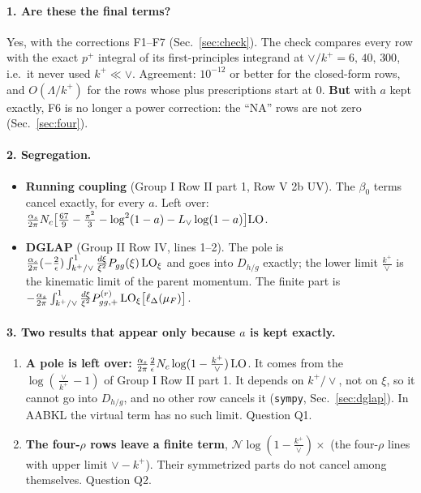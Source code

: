 \documentclass[10pt]{article}
\numberwithin{equation}{section}
\newcommand{\Lv}{L_{\vee}}
\newcommand{\NN}{\mathcal N}
\newcommand{\LOx}[1]{{\rm LO}_\xi\big[#1\big]}
\begin{document}
\paragraph{1. Are these the final terms?} Yes, with the corrections F1--F7 (Sec.~\ref{sec:check}). The check compares every row with the exact $p^+$ integral of its first-principles integrand at $\vee/k^+=6,\,40,\,300$, i.e.\ it never used $k^+\ll\vee$. Agreement: $10^{-12}$ or better for the closed-form rows, and $O(\Lambda/k^+)$ for the rows whose plus prescriptions start at 0. \textbf{But} with $a$ kept exactly, F6 is no longer a power correction: the ``NA'' rows are not zero (Sec.~\ref{sec:four}).

\paragraph{2. Segregation.}
\begin{itemize}
\item \textbf{Running coupling} (Group I Row II part 1, Row V 2b UV). The $\beta_0$ terms cancel exactly, for every $a$. Left over: $\frac{\alpha_s}{2\pi}N_c\big[\frac{67}{9}-\frac{\pi^2}{3}-\log^2(1-a)-\Lv\log(1-a)\big]{\rm LO}$.
\item \textbf{DGLAP} (Group II Row IV, lines 1--2). The pole is $\frac{\alpha_s}{2\pi}(-\frac2\epsilon)\int_{k^+/\vee}^1\frac{d\xi}{\xi^2}P_{gg}(\xi)\,{\rm LO}_\xi$ and goes into $D_{h/g}$ exactly; the lower limit $\frac{k^+}{\vee}$ is the kinematic limit of the parent momentum. The finite part is $-\frac{\alpha_s}{2\pi}\int_{k^+/\vee}^1\frac{d\xi}{\xi^2}P^{(r)}_{gg,+}\,\LOx{\ell_\Delta(\mu_F)}$.
\end{itemize}

\paragraph{3. Two results that appear only because $a$ is kept exactly.}
\begin{enumerate}
\item \textbf{A pole is left over:} $\frac{\alpha_s}{2\pi}\frac{2}{\epsilon}N_c\log(1-\frac{k^+}{\vee})\,{\rm LO}$. It comes from the $\log(\frac{\vee}{k^+}-1)$ of Group I Row II part 1. It depends on $k^+/\vee$, not on $\xi$, so it cannot go into $D_{h/g}$, and no other row cancels it (\texttt{sympy}, Sec.~\ref{sec:dglap}). In AABKL the virtual term has no such limit. Question Q1.
\item \textbf{The four-$\rho$ rows leave a finite term}, $\NN\log(1-\frac{k^+}{\vee})\times$ (the four-$\rho$ lines with upper limit $\vee-k^+$). Their symmetrized parts do not cancel among themselves. Question Q2.
\end{enumerate}
\end{document}
